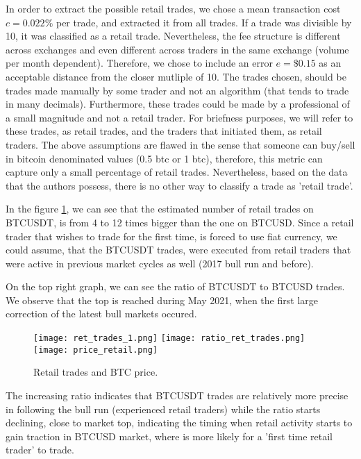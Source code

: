 In order to extract the possible retail trades, we chose a mean transaction cost \( c = 0.022\% \) per trade, and extracted it from all trades. If a trade was divisible by 10, it was classified as a retail trade. Nevertheless, the fee structure is different across exchanges and even different across traders in the same exchange (volume per month dependent). Therefore, we chose to include an error \(e = \$0.15 \) as an acceptable distance from the closer mutliple of 10. The trades chosen, should be trades made manually by some trader and not an algorithm (that tends to trade in many decimals). Furthermore, these trades could be made by a professional of a small magnitude and not a retail trader. For briefness purposes, we will refer to these trades, as retail trades, and the traders that initiated them, as retail traders. The above assumptions are flawed in the sense that someone can buy/sell in bitcoin denominated  values (0.5 btc or 1 btc), therefore, this metric can capture only a small percentage of retail trades. Nevertheless, based on the data that the authors possess, there is no other way to classify a trade as 'retail trade'.
 
In the figure \ref{fig:ret1}, we can see that the estimated number of retail trades on BTCUSDT, is from 4 to 12 times bigger than the one on BTCUSD. Since a retail trader that wishes to trade for the first time, is forced to use fiat currency, we could assume, that the BTCUSDT trades, were executed from retail traders that were active in previous market cycles as well (2017 bull run and before). 

On the top right graph, we can see the ratio of BTCUSDT to BTCUSD trades. We observe that the top is reached during May 2021, when the first large correction of the latest bull markets occured. 



\begin{figure}[H]
	\centering
    \texttt{[image: ret\_trades\_1.png]}
    \texttt{[image: ratio\_ret\_trades.png]}
     \\[\smallskipamount]
    \texttt{[image: price\_retail.png]}
	\caption{Retail trades and BTC price.}
    \label{fig:ret1}
\end{figure}

The increasing ratio indicates that BTCUSDT trades are relatively more precise in following the bull run (experienced retail traders) while the ratio starts declining, close to market top, indicating the timing when retail activity starts to gain traction in BTCUSD market, where is more likely for a 'first time retail trader' to trade.

